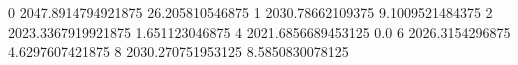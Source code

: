 0 2047.8914794921875 26.205810546875
1 2030.78662109375 9.1009521484375
2 2023.3367919921875 1.651123046875
4 2021.6856689453125 0.0
6 2026.3154296875 4.6297607421875
8 2030.270751953125 8.5850830078125
